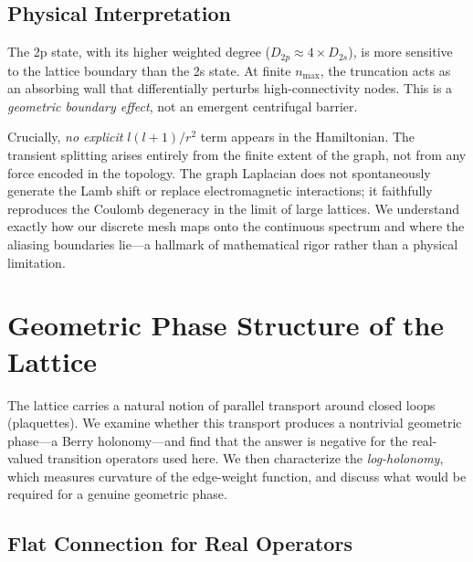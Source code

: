 \documentclass[aps,pra,twocolumn,superscriptaddress,longbibliography]{revtex4-2}
\begin{document}
\subsection{Physical Interpretation}

The 2p state, with its higher weighted degree
($D_{2p} \approx 4 \times D_{2s}$), is more sensitive to the
lattice boundary than the 2s state. At finite $n_{\max}$, the
truncation acts as an absorbing wall that differentially perturbs
high-connectivity nodes. This is a \emph{geometric boundary effect},
not an emergent centrifugal barrier.

Crucially, \textit{no explicit} $l(l+1)/r^2$ term appears in the
Hamiltonian. The transient splitting arises entirely from the finite
extent of the graph, not from any force encoded in the topology.
The graph Laplacian does not spontaneously generate the Lamb shift
or replace electromagnetic interactions; it faithfully reproduces
the Coulomb degeneracy in the limit of large lattices. We understand
exactly how our discrete mesh maps onto the continuous spectrum and
where the aliasing boundaries lie---a hallmark of mathematical rigor
rather than a physical limitation.


\section{Geometric Phase Structure of the Lattice}
\label{sec:relativity}

The lattice carries a natural notion of parallel transport around closed loops
(plaquettes).  We examine whether this transport produces a nontrivial
geometric phase---a Berry holonomy---and find that the answer is negative for
the real-valued transition operators used here.  We then characterize the
\emph{log-holonomy}, which measures curvature of the edge-weight function,
and discuss what would be required for a genuine geometric phase.

\subsection{Flat Connection for Real Operators}
\end{document}
